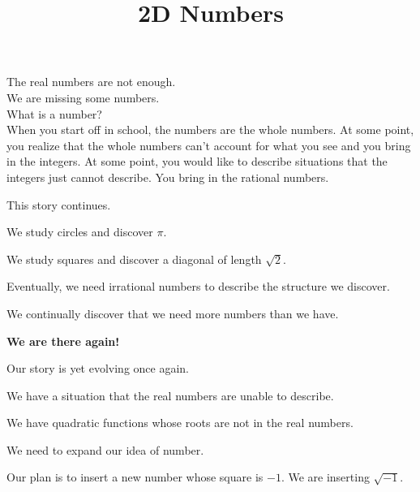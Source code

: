 \documentclass{ximera}
\title{2D Numbers}
\begin{document}
\begin{abstract}
\end{abstract}
\maketitle





The real numbers are not enough. \\


We are missing some numbers. \\


What is a number? \\


When you start off in school, the numbers are the whole numbers.  At some point, you realize that the whole numbers can't account for what you see and you bring in the integers.  At some point, you would like to describe situations that the integers just cannot describe.  You bring in the rational numbers. 


This story continues.

We study circles and discover $\pi$.

We study squares and discover a diagonal of length $\sqrt{2}$.


Eventually, we need irrational numbers to describe the structure we discover.


We continually discover that we need more numbers than we have. \\


\begin{center}
\textbf{\textcolor{red!90!darkgray}{We are there again!}}
\end{center}


Our story is yet evolving once again.


\begin{explanation}

We have a situation that the real numbers are unable to describe.


We have quadratic functions whose roots are not in the real numbers.  


We need to expand our idea of number.

\end{explanation}



Our plan is to insert a new number whose square is $-1$.  We are inserting $\sqrt{-1}$.  
\end{document}
